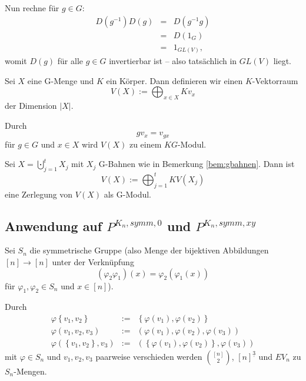\documentclass[10p,a4paper,BCOR = 12mm, DIV=15]{scrbook}
\begin{document}
{\begin{Bem}
Nun rechne für $g \in G$:
\begin{eqnarray*}
D\left(g^{-1}\right) D\left(g\right) & = &  D\left(g^{-1} g\right) \\
& = & D\left(1_G\right) \\
& = & 1_{GL\left(V\right)},
\end{eqnarray*}
womit $D\left(g\right)$ für alle $g \in G$ invertierbar ist -- also tatsächlich in $GL\left(V\right)$ liegt.
\end{Bem}

\begin{Def}
\label{def:G-Menge-Modul}
Sei $X$ eine G-Menge und $K$ ein Körper. Dann definieren wir einen $K$-Vektorraum
\begin{displaymath}
V\left(X\right) := \bigoplus_{x \in X} K v_{x}
\end{displaymath}
der Dimension $\left|X\right|$.

Durch
\begin{displaymath}
g v_{x} = v_{g x}
\end{displaymath}
für $g\in G$ und $x \in X$ wird $V\left(X\right)$ zu einem $K G$-Modul.
\end{Def}

\begin{Bem}
Sei $X = \bigcupdot_{j=1}^t X_j$ mit $X_j$ G-Bahnen wie in Bemerkung \ref{bem:gbahnen}. Dann ist
\begin{displaymath}
V\left(X\right) := \bigoplus_{j=1}^t K V\left(X_j\right)
\end{displaymath}
eine Zerlegung von $V\left(X\right)$ als G-Modul.
\end{Bem}

\subsection{Anwendung auf $P^{K_n, symm, 0}$ und $P^{K_n, symm, xy}$}

Sei $S_n$ die symmetrische Gruppe (also Menge der bijektiven Abbildungen $\left[n\right] \rightarrow \left[n\right]$ unter der Verknüpfung
\begin{displaymath}
\left(\varphi_2 \varphi_1\right) \left(x\right) = \varphi_2 \left(\varphi_1 \left(x\right)\right) 
\end{displaymath}
für $\varphi_1, \varphi_2 \in S_n$ und $x\in \left[n\right]$).

Durch
\begin{eqnarray*}
\varphi \left\{v_1, v_2\right\} & := & \left\{\varphi\left(v_1\right), \varphi\left(v_2\right)\right\} \\
\varphi \left(v_1, v_2, v_3\right) & := & \left(\varphi\left(v_1\right), \varphi\left(v_2\right), \varphi\left(v_3\right)\right) \\
\varphi \left(\left\{v_1, v_2\right\}, v_3\right) & := & \left(\left\{\varphi\left(v_1\right), \varphi\left(v_2\right)\right\}, \varphi\left(v_3\right)\right)
\end{eqnarray*}
mit $\varphi \in S_n$ und $v_1, v_2, v_3$ paarweise verschieden werden ${\left[n\right] \choose 2}$, $\left[n\right]^{\underline{3}}$ und $EV_n$ zu $S_n$-Mengen.

}
\end{document}
